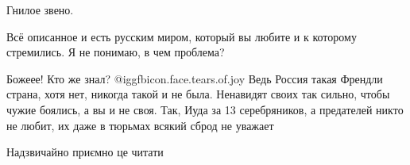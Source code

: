\begin{itemize}
Гнилое звено.

Всё описанное и есть русским миром, который вы любите и к которому стремились. Я не понимаю, в чем проблема?


Божеее! Кто же знал?  @igg{fbicon.face.tears.of.joy}  Ведь Россия такая Френдли страна, хотя нет, никогда
такой и не была. Ненавидят своих так сильно, чтобы чужие боялись, а вы и не
своя. Так, Иуда за 13 серебряников, а предателей никто не любит, их даже в
тюрьмах всякий сброд не уважает

Надзвичайно приємно це читати

\end{itemize} %
